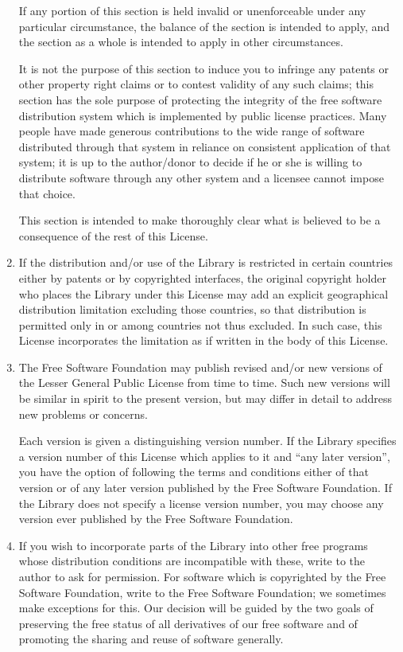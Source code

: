 \begin{enumerate}
If any portion of this section is held invalid or unenforceable under any
particular circumstance, the balance of the section is intended to apply,
and the section as a whole is intended to apply in other circumstances.

It is not the purpose of this section to induce you to infringe any
patents or other property right claims or to contest validity of any
such claims; this section has the sole purpose of protecting the
integrity of the free software distribution system which is
implemented by public license practices.  Many people have made
generous contributions to the wide range of software distributed
through that system in reliance on consistent application of that
system; it is up to the author/donor to decide if he or she is willing
to distribute software through any other system and a licensee cannot
impose that choice.

This section is intended to make thoroughly clear what is believed to
be a consequence of the rest of this License.

\item If the distribution and/or use of the Library is restricted in
certain countries either by patents or by copyrighted interfaces, the
original copyright holder who places the Library under this License may add
an explicit geographical distribution limitation excluding those countries,
so that distribution is permitted only in or among countries not thus
excluded.  In such case, this License incorporates the limitation as if
written in the body of this License.

\item The Free Software Foundation may publish revised and/or new
versions of the Lesser General Public License from time to time.
Such new versions will be similar in spirit to the present version,
but may differ in detail to address new problems or concerns.

Each version is given a distinguishing version number.  If the Library
specifies a version number of this License which applies to it and
``any later version'', you have the option of following the terms and
conditions either of that version or of any later version published by
the Free Software Foundation.  If the Library does not specify a
license version number, you may choose any version ever published by
the Free Software Foundation.

\item If you wish to incorporate parts of the Library into other free
programs whose distribution conditions are incompatible with these,
write to the author to ask for permission.  For software which is
copyrighted by the Free Software Foundation, write to the Free
Software Foundation; we sometimes make exceptions for this.  Our
decision will be guided by the two goals of preserving the free status
of all derivatives of our free software and of promoting the sharing
and reuse of software generally.


\end{enumerate}

